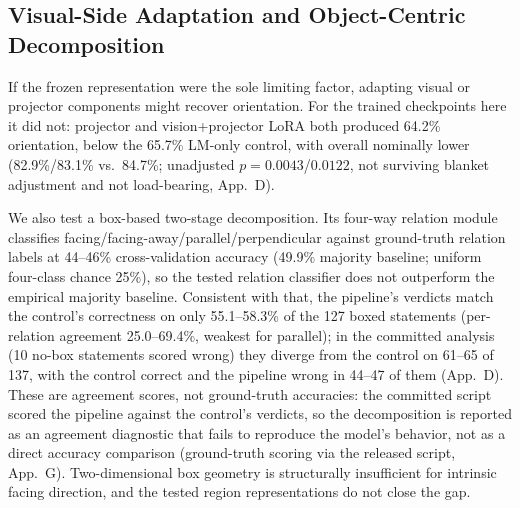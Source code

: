 \documentclass[10pt,twocolumn,letterpaper]{article}
\begin{document}
\subsection{Visual-Side Adaptation and Object-Centric Decomposition}
If the frozen representation were the sole limiting factor, adapting visual or projector components might recover orientation. For the trained checkpoints here it did not: projector and vision+projector LoRA both produced 64.2\% orientation, below the 65.7\% LM-only control, with overall nominally lower (82.9\%/83.1\% vs.\ 84.7\%; unadjusted $p{=}0.0043$/$0.0122$, not surviving blanket adjustment and not load-bearing, App.~D).

We also test a box-based two-stage decomposition. Its four-way relation module classifies facing/facing-away/parallel/perpendicular against ground-truth relation labels at 44--46\% cross-validation accuracy (49.9\% majority baseline; uniform four-class chance 25\%), so the tested relation classifier does not outperform the empirical majority baseline. Consistent with that, the pipeline's verdicts match the control's correctness on only 55.1--58.3\% of the 127 boxed statements (per-relation agreement 25.0--69.4\%, weakest for parallel); in the committed analysis (10 no-box statements scored wrong) they diverge from the control on 61--65 of 137, with the control correct and the pipeline wrong in 44--47 of them (App.~D). These are agreement scores, not ground-truth accuracies: the committed script scored the pipeline against the control's verdicts, so the decomposition is reported as an agreement diagnostic that fails to reproduce the model's behavior, not as a direct accuracy comparison (ground-truth scoring via the released script, App.~G). Two-dimensional box geometry is structurally insufficient for intrinsic facing direction, and the tested region representations do not close the gap.
\end{document}
